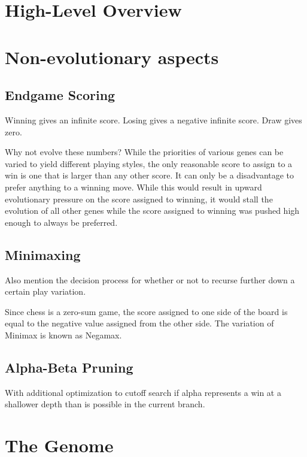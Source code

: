 \documentclass[letter]{article}
\renewcommand\_{\textunderscore\allowbreak}
\begin{document}
\section{High-Level Overview}




\section{Non-evolutionary aspects}

\subsection{Endgame Scoring}

Winning gives an infinite score.
Losing gives a negative infinite score.
Draw gives zero.

Why not evolve these numbers? While the priorities of various genes can be varied to yield different playing styles, the only reasonable score to assign to a win is one that is larger than any other score. It can only be a disadvantage to prefer anything to a winning move. While this would result in upward evolutionary pressure on the score assigned to winning, it would stall the evolution of all other genes while the score assigned to winning was pushed high enough to always be preferred.

\subsection{Minimaxing}

Also mention the decision process for whether or not to recurse further down a certain play variation.

Since chess is a zero-sum game, the score assigned to one side of the board is equal to the negative value assigned from the other side. The variation of Minimax is known as Negamax.

\subsection{Alpha-Beta Pruning}

With additional optimization to cutoff search if alpha represents a win at a shallower depth than is possible in the current branch.




\section{The Genome}
\end{document}
